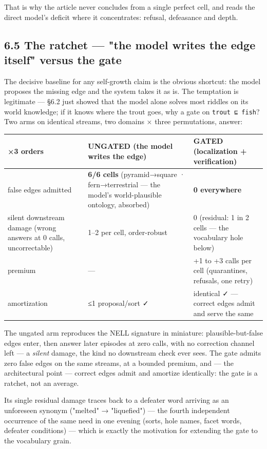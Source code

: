 \documentclass[11pt]{article}
\begin{document}
That is why the article never concludes from a single perfect cell, and reads the direct model's deficit where it concentrates: refusal, defeasance and depth.

\subsection*{6.5 The ratchet — "the model writes the edge itself" versus the gate}

The decisive baseline for any self-growth claim is the obvious shortcut: the model proposes the missing edge and the system takes it as is. The temptation is legitimate — §6.2 just showed that the model alone solves most riddles on its world knowledge; if it knows where the trout goes, why a gate on \texttt{trout ⊑ fish}? Two arms on identical streams, two domains × three permutations, answer:

\begin{center}\small\begin{tabular}{lll}\toprule
×3 orders & UNGATED (the model writes the edge) & GATED (localization + verification) \\ \midrule
false edges admitted & \textbf{6/6 cells} (pyramid→square · fern→terrestrial — the model's world-plausible ontology, absorbed) & \textbf{0 everywhere} \\
silent downstream damage (wrong answers at 0 calls, uncorrectable) & 1–2 per cell, order-robust & 0 (residual: 1 in 2 cells — the vocabulary hole below) \\
premium & — & +1 to +3 calls per cell (quarantines, refusals, one retry) \\
amortization & ≤1 proposal/sort ✓ & identical ✓ — correct edges admit and serve the same \\
\bottomrule\end{tabular}\end{center}

The ungated arm reproduces the NELL signature in miniature: plausible-but-false edges enter, then answer later episodes at zero calls, with no correction channel left — a \emph{silent} damage, the kind no downstream check ever sees. The gate admits zero false edges on the same streams, at a bounded premium, and — the architectural point — correct edges admit and amortize identically: the gate is a ratchet, not an average.

Its single residual damage traces back to a defeater word arriving as an unforeseen synonym ("melted" → "liquefied") — the fourth independent occurrence of the same need in one evening (sorts, hole names, facet words, defeater conditions) — which is exactly the motivation for extending the gate to the vocabulary grain.
\end{document}
